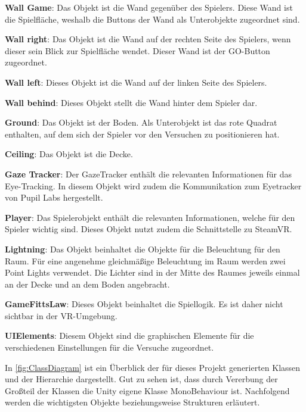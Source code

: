 \begin{description}
	\item \textbf{Wall Game}: Das Objekt ist die Wand gegenüber des Spielers. Diese Wand ist die Spielfläche, weshalb die Buttons der Wand als Unterobjekte zugeordnet sind. 
	\item \textbf{Wall right}: Das Objekt ist die Wand auf der rechten Seite des Spielers, wenn dieser sein Blick zur Spielfläche wendet. Dieser Wand ist der GO-Button zugeordnet.
	\item \textbf{Wall left}: Dieses Objekt ist die Wand auf der linken Seite des Spielers.
	\item \textbf{Wall behind}: Dieses Objekt stellt die Wand hinter dem Spieler dar.
	\item \textbf{Ground}: Das Objekt ist der Boden. Als Unterobjekt ist das rote Quadrat enthalten, auf dem sich der Spieler vor den Versuchen zu positionieren hat.
	\item \textbf{Ceiling}: Das Objekt ist die Decke.
	\item \textbf{Gaze Tracker}: Der GazeTracker enthält die relevanten Informationen für das Eye-Tracking. In diesem Objekt wird zudem die Kommunikation zum Eyetracker von Pupil Labs hergestellt.
	\item \textbf{Player}: Das Spielerobjekt enthält die relevanten Informationen, welche für den Spieler wichtig sind. Dieses Objekt nutzt zudem die Schnittstelle zu SteamVR. 
	\item \textbf{Lightning}: Das Objekt beinhaltet die Objekte für die Beleuchtung für den Raum. Für eine angenehme gleichmäßige Beleuchtung im Raum werden zwei Point Lights verwendet. Die Lichter sind in der Mitte des Raumes jeweils einmal an der Decke und an dem Boden angebracht. 
	\item \textbf{GameFittsLaw}: Dieses Objekt beinhaltet die Spiellogik. Es ist daher nicht sichtbar in der \ac{VR}-Umgebung.
	\item \textbf{UIElements}: Diesem Objekt sind die graphischen Elemente für die verschiedenen Einstellungen für die Versuche zugeordnet.
\end{description}

In \autoref{fig:ClassDiagram} ist ein Überblick der für dieses Projekt generierten Klassen und der Hierarchie dargestellt. Gut zu sehen ist, dass durch Vererbung der Großteil der Klassen die Unity eigene Klasse MonoBehaviour ist. Nachfolgend werden die wichtigsten Objekte beziehungsweise Strukturen erläutert. 

